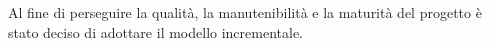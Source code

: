 Al fine di perseguire la qualità, la manutenibilità e la maturità del progetto
è stato deciso di adottare il {modello incrementale}.